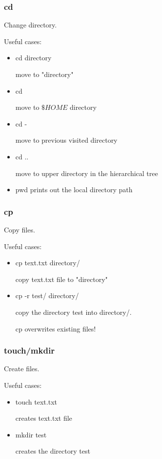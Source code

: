 \begin{frame}[fragile]
	\frametitle{ cd}
Change directory.

Useful cases:
	\begin{itemize}
        \item cd directory 

        move to "directory" 
        \item cd
 
         move to $\$HOME$ directory
        \item cd - 

        move to previous visited directory

        \item cd ..

        move to upper directory in the hierarchical tree

        \item pwd 
        prints out the local directory path
 
	\end{itemize}
        
\end{frame}

\begin{frame}
	\frametitle{ cp}
        Copy files.

Useful cases:
	\begin{itemize}
        \item cp text.txt directory/

        copy text.txt file to "directory" 
        \item cp -r test/ directory/ 
 
        copy the directory test into directory/. 

        cp overwrites existing files!

	\end{itemize}
        

\end{frame}


\begin{frame}
	\frametitle{ touch/mkdir}
        Create files.

Useful cases:
	\begin{itemize}
        \item touch text.txt

        creates text.txt file  
        \item mkdir test  
 
        creates the directory test 

	\end{itemize}

\end{frame}

